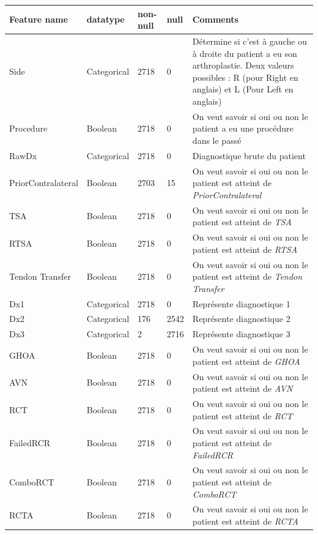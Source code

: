 \documentclass[12pt, french]{report}
\begin{document}
\begin{longtable}{ | p{} | p{} | p{}  | p{} | p{} |  } 
\hline
\textbf{Feature name} & \textbf{datatype} & \textbf{non-null }& \textbf{ null } & \textbf{Comments}\\ \hline

Side & Categorical & 2718 & 0 & Détermine si c'est à gauche ou à droite du patient a eu son arthroplastie. Deux valeurs possibles : R (pour Right en anglais) et  L (Pour Left en anglais) \\ \hline 
Procedure & Boolean & 2718 & 0& On veut savoir si oui ou non le patient a eu une procédure dans le passé \\ \hline 
RawDx & Categorical & 2718 & 0 & Diagnostique brute du patient  \\ \hline 
PriorContralateral & Boolean & 2703 & 15& On veut savoir si oui ou non le patient est atteint de \textit{PriorContralateral} \\ \hline 
TSA & Boolean & 2718 & 0& On veut savoir si oui ou non le patient est atteint de \textit{TSA} \\ \hline 
RTSA & Boolean & 2718 & 0& On veut savoir si oui ou non le patient est atteint de \textit{RTSA} \\ \hline 
Tendon Transfer & Boolean & 2718 & 0& On veut savoir si oui ou non le patient est atteint de \textit{Tendon Transfer} \\ \hline 
Dx1 & Categorical & 2718 & 0 & Représente diagnostique 1 \\ \hline 
Dx2 & Categorical & 176 & 2542 & Représente diagnostique 2 \\ \hline 
Dx3 & Categorical & 2 & 2716 & Représente diagnostique 3 \\ \hline 
GHOA & Boolean & 2718 & 0& On veut savoir si oui ou non le patient est atteint de \textit{GHOA} \\ \hline 
AVN & Boolean & 2718 & 0& On veut savoir si oui ou non le patient est atteint de \textit{AVN} \\ \hline 
RCT & Boolean & 2718 & 0& On veut savoir si oui ou non le patient est atteint de \textit{RCT} \\ \hline 
FailedRCR & Boolean & 2718 & 0& On veut savoir si oui ou non le patient est atteint de \textit{FailedRCR} \\ \hline 
ComboRCT & Boolean & 2718 & 0& On veut savoir si oui ou non le patient est atteint de \textit{ComboRCT} \\ \hline 
RCTA & Boolean & 2718 & 0& On veut savoir si oui ou non le patient est atteint de \textit{RCTA} \\ \hline 

\end{longtable}
\end{document}
